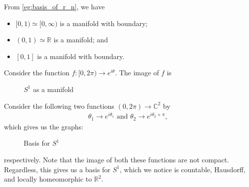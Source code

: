 \documentclass[notoc,notitlepage]{tufte-book}
\begin{document}
From \cref{eg:basis_of_r_n}, we have
\begin{itemize}
  \item $[0, 1) \simeq [0, \infty)$ is a manifold with boundary;
  \item $(0, 1) \simeq \mathbb{R}$ is a manifold; and
  \item $[0, 1]$ is a manifold with boundary.
\end{itemize}

\begin{eg}[$S^1$ is a manifold]
  Consider the function $f : [0, 2 \pi) \to e^{i \theta}$. The image of $f$ is
  \begin{figure}[ht]
    \centering
    \caption{$S^1$ as a manifold}
    \label{fig:s_1_as_a_manifold}
  \end{figure}
  Consider the following two functions $(0, 2\pi) \to \mathbb{C}^2$ by
  \begin{gather*}
    \theta_1 \to e^{i \theta_1} \text{ and } \theta_2 \to e^{i \theta_2 + \pi},
  \end{gather*}
  which gives us the graphs:
  \begin{figure}[ht]
    \centering
    \caption{Basis for $S^1$}
    \label{fig:basis_for__s_1_}
  \end{figure}

  \noindent
  respectively. Note that the image of both these functions are not compact.
  Regardless, this gives us a basis for $S^1$, which we notice is countable,
  Hausdorff, and locally homeomorphic to $\mathbb{R}^2$.
\end{eg}
\end{document}
